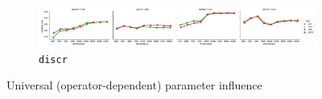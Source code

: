 \begin{figure}
  \begin{subfigure}[t]{\textwidth}
  \includegraphics[width=1.1\textwidth]{supplement/figures/universal-interaction-discr}

  \caption{\texttt{discr}}
  \label{fig:universal-discr}
  \end{subfigure}

  \caption{Universal (operator-dependent) parameter influence}
  \label{fig:universal-parameters}
\end{figure}
